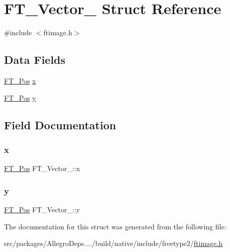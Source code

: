 \hypertarget{struct_f_t___vector__}{}\section{F\+T\+\_\+\+Vector\+\_\+ Struct Reference}
\label{struct_f_t___vector__}


{\ttfamily \#include $<$ftimage.\+h$>$}

\subsection*{Data Fields}
\begin{DoxyCompactItemize}
\item 
\hyperlink{ftimage_8h_af5f230f4b253d4c7715fd2e595614c90}{F\+T\+\_\+\+Pos} \hyperlink{struct_f_t___vector___a941e818e6dfca06409cddff4f325f74c}{x}
\item 
\hyperlink{ftimage_8h_af5f230f4b253d4c7715fd2e595614c90}{F\+T\+\_\+\+Pos} \hyperlink{struct_f_t___vector___ac3246ed214e880047ec74eeb15f8b973}{y}
\end{DoxyCompactItemize}


\subsection{Field Documentation}
\mbox{\label{struct_f_t___vector___a941e818e6dfca06409cddff4f325f74c}} 
\subsubsection{\texorpdfstring{x}{x}}
{\footnotesize\ttfamily \hyperlink{ftimage_8h_af5f230f4b253d4c7715fd2e595614c90}{F\+T\+\_\+\+Pos} F\+T\+\_\+\+Vector\+\_\+\+::x}

\mbox{\label{struct_f_t___vector___ac3246ed214e880047ec74eeb15f8b973}} 
\subsubsection{\texorpdfstring{y}{y}}
{\footnotesize\ttfamily \hyperlink{ftimage_8h_af5f230f4b253d4c7715fd2e595614c90}{F\+T\+\_\+\+Pos} F\+T\+\_\+\+Vector\+\_\+\+::y}



The documentation for this struct was generated from the following file\+:\begin{DoxyCompactItemize}
\item 
src/packages/\+Allegro\+Deps..../build/native/include/freetype2/\hyperlink{ftimage_8h}{ftimage.\+h}\end{DoxyCompactItemize}
